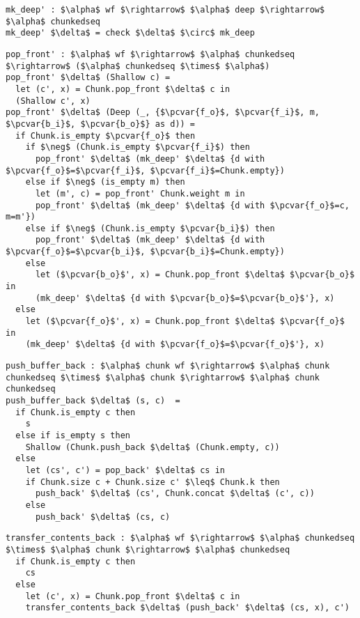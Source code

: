 \documentclass[10pt]{article}
\newcommand{\pcvar}[1]{\mathtt{#1}}
\begin{document}
\begin{lstlisting}[language=pcpp,style=nonumbers]
mk_deep' : $\alpha$ wf $\rightarrow$ $\alpha$ deep $\rightarrow$ $\alpha$ chunkedseq
mk_deep' $\delta$ = check $\delta$ $\circ$ mk_deep
\end{lstlisting}

\begin{lstlisting}[language=pcpp,style=nonumbers]
pop_front' : $\alpha$ wf $\rightarrow$ $\alpha$ chunkedseq $\rightarrow$ ($\alpha$ chunkedseq $\times$ $\alpha$)
pop_front' $\delta$ (Shallow c) =
  let (c', x) = Chunk.pop_front $\delta$ c in
  (Shallow c', x)
pop_front' $\delta$ (Deep (_, {$\pcvar{f_o}$, $\pcvar{f_i}$, m, $\pcvar{b_i}$, $\pcvar{b_o}$} as d)) =
  if Chunk.is_empty $\pcvar{f_o}$ then
    if $\neg$ (Chunk.is_empty $\pcvar{f_i}$) then
      pop_front' $\delta$ (mk_deep' $\delta$ {d with $\pcvar{f_o}$=$\pcvar{f_i}$, $\pcvar{f_i}$=Chunk.empty})
    else if $\neg$ (is_empty m) then 
      let (m', c) = pop_front' Chunk.weight m in
      pop_front' $\delta$ (mk_deep' $\delta$ {d with $\pcvar{f_o}$=c, m=m'})
    else if $\neg$ (Chunk.is_empty $\pcvar{b_i}$) then
      pop_front' $\delta$ (mk_deep' $\delta$ {d with $\pcvar{f_o}$=$\pcvar{b_i}$, $\pcvar{b_i}$=Chunk.empty})
    else
      let ($\pcvar{b_o}$', x) = Chunk.pop_front $\delta$ $\pcvar{b_o}$ in
      (mk_deep' $\delta$ {d with $\pcvar{b_o}$=$\pcvar{b_o}$'}, x)
  else
    let ($\pcvar{f_o}$', x) = Chunk.pop_front $\delta$ $\pcvar{f_o}$ in
    (mk_deep' $\delta$ {d with $\pcvar{f_o}$=$\pcvar{f_o}$'}, x)
\end{lstlisting}

\begin{lstlisting}[language=pcpp,style=nonumbers]
push_buffer_back : $\alpha$ chunk wf $\rightarrow$ $\alpha$ chunk chunkedseq $\times$ $\alpha$ chunk $\rightarrow$ $\alpha$ chunk chunkedseq
push_buffer_back $\delta$ (s, c)  =
  if Chunk.is_empty c then
    s
  else if is_empty s then
    Shallow (Chunk.push_back $\delta$ (Chunk.empty, c))
  else
    let (cs', c') = pop_back' $\delta$ cs in
    if Chunk.size c + Chunk.size c' $\leq$ Chunk.k then
      push_back' $\delta$ (cs', Chunk.concat $\delta$ (c', c))
    else
      push_back' $\delta$ (cs, c)
\end{lstlisting}

\begin{lstlisting}[language=pcpp,style=nonumbers]
transfer_contents_back : $\alpha$ wf $\rightarrow$ $\alpha$ chunkedseq $\times$ $\alpha$ chunk $\rightarrow$ $\alpha$ chunkedseq
  if Chunk.is_empty c then
    cs
  else
    let (c', x) = Chunk.pop_front $\delta$ c in
    transfer_contents_back $\delta$ (push_back' $\delta$ (cs, x), c')
\end{lstlisting}
\end{document}
